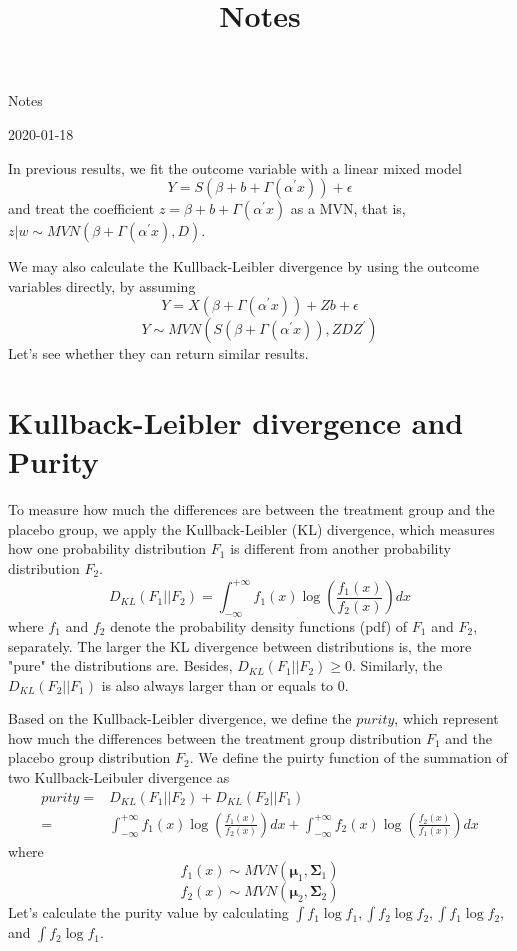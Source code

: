\documentclass[11pt]{article}
\title{Notes}
\begin{document}
Notes 

2020-01-18

\noindent
In previous results, we fit the outcome variable with a linear mixed model 
$$Y = S(\beta + b + \Gamma(\alpha^\prime x)) + \epsilon$$
and treat the coefficient 
$z = \beta + b + \Gamma(\alpha^\prime x)$ as a MVN, that is, 
$z| w \sim MVN(\beta + \Gamma(\alpha^\prime x), D)$. 

\noindent
We may also calculate the Kullback-Leibler divergence by using the outcome variables directly, by assuming
$$Y = X(\beta +\Gamma(\alpha^\prime x)) + Z b +  \epsilon$$
$$Y \sim MVN(S(\beta +\Gamma(\alpha^\prime x)) , Z D Z ^\prime)$$
Let's see whether they can return similar results. 


\section{Kullback-Leibler divergence and Purity}

To measure how much the differences are between the treatment group and the placebo group, we apply the Kullback-Leibler (KL) divergence, which measures how one probability distribution $F_1$ is different from another probability distribution $F_2$. 
\begin{equation} \label{eq0}
D_{KL}(F_1 || F_2) = \int_{-\infty}^{+\infty} f_1(x) \log(\frac{f_1(x)}{f_2(x)})dx
\end{equation}
where $f_1$ and $f_2$ denote the probability density functions (pdf) of $F_1$ and $F_2$, separately. The larger the KL divergence between distributions is, the more "pure" the distributions are. 
Besides, $D_{KL}(F_1 || F_2) \geq 0$. Similarly, the $D_{KL}(F_2 || F_1)$ is also always larger than or equals to 0.

\noindent
Based on the Kullback-Leibler divergence, we define the $purity$, which represent how much the differences between the treatment group distribution $F_1$ and the placebo group distribution $F_2$. 
\noindent
We define the puirty function of the summation of two Kullback-Leibuler divergence as 
\begin{equation} \label{eq4}
\begin{aligned}
purity = & D_{KL}(F_1 || F_2) + D_{KL}(F_2 || F_1) \\
 = &\int_{-\infty}^{+\infty} f_1(x) \log(\frac{f_1(x)}{f_2(x)})dx +  \int_{-\infty}^{+\infty} f_2(x) \log(\frac{f_2(x)}{f_1(x)})dx
\end{aligned}
\end{equation}
where 
$$f_1(x) \sim MVN(\bm \mu_1, \bm \Sigma_1)$$
$$f_2(x) \sim MVN(\bm \mu_2, \bm \Sigma_2)$$
Let's calculate the purity value by calculating
$\int f_1 \log f_1, \int f_2 \log f_2, \int f_1 \log f_2$, and $\int f_2 \log f_1$.
\end{document}
